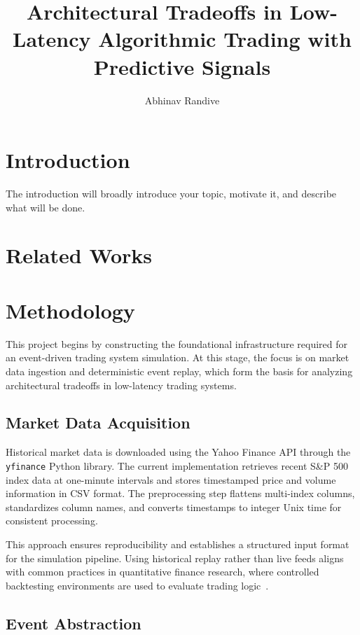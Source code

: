 \documentclass[12pt]{article}
\title{\textbf{Architectural Tradeoffs in Low-Latency
Algorithmic Trading with Predictive Signals}}
\author{Abhinav Randive}
\begin{document}
\maketitle

\section{Introduction}
The introduction will broadly introduce your topic, motivate it, and describe what will be done.

\section{Related Works}

\section{Methodology}

This project begins by constructing the foundational infrastructure required for an event-driven trading system simulation. At this stage, the focus is on market data ingestion and deterministic event replay, which form the basis for analyzing architectural tradeoffs in low-latency trading systems.

\subsection{Market Data Acquisition}

Historical market data is downloaded using the Yahoo Finance API through the \texttt{yfinance} Python library. The current implementation retrieves recent S\&P 500 index data at one-minute intervals and stores timestamped price and volume information in CSV format. The preprocessing step flattens multi-index columns, standardizes column names, and converts timestamps to integer Unix time for consistent processing.

This approach ensures reproducibility and establishes a structured input format for the simulation pipeline. Using historical replay rather than live feeds aligns with common practices in quantitative finance research, where controlled backtesting environments are used to evaluate trading logic~\cite{aldridgeHFT, carteaMicrostructure}.

\subsection{Event Abstraction}
\end{document}
